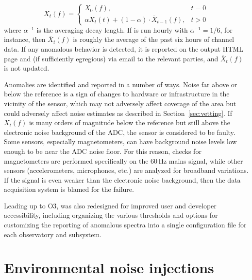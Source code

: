 \begin{equation}
	\overline{X}_t(f) =
		\begin{cases}
			X_0(f), & t=0\\
			\alpha X_t(t) + (1 - \alpha) \cdot \overline{X}_{t-1}(f), & t > 0
		\end{cases}
\end{equation}
where $\alpha^{-1}$ is the averaging decay length.
If \ligocam is run hourly with $\alpha^{-1}=1/6$, for instance, then $\overline{X}_t(f)$ is roughly the average of the past six hours of channel data.
If any anomalous behavior is detected, it is reported on the output HTML page and (if sufficiently egregious) via email to the relevant parties, and $\overline{X}_t(f)$ is not updated.

Anomalies are identified and reported in a number of ways.
Noise far above or below the reference is a sign of changes to hardware or infrastructure in the vicinity of the sensor, which may not adversely affect coverage of the area but could adversely affect noise estimates as described in Section~\ref{sec:vetting}.
If $X_t(f)$ is many orders of magnitude below the reference but still above the electronic noise background of the \ac{ADC}, the sensor is considered to be faulty.
Some sensors, especially magnetometers, can have background noise levels low enough to be near the \ac{ADC} noise floor.
For this reason, \ligocam checks for magnetometers are performed specifically on the 60\,Hz mains signal, while other sensors (accelerometers, microphones, etc.) are analyzed for broadband variations.
If the signal is even weaker than the electronic noise background, then the data acquisition system is blamed for the failure.

Leading up to O3, \ligocam was also redesigned for improved user and developer accessibility, including organizing the various thresholds and options for customizing the reporting of anomalous spectra into a single configuration file for each observatory and subsystem.


\section{Environmental noise injections}\label{sec:injections}

